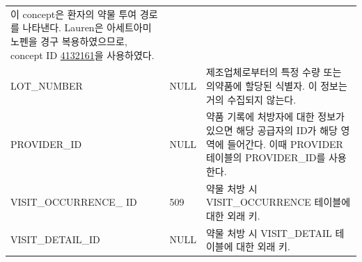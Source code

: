 \documentclass[10.5pt]{book}
\theoremstyle{definition}
\theoremstyle{definition}
\theoremstyle{definition}
\theoremstyle{remark}
\begin{document}
\begin{longtable}[]{@{}lll@{}}
\begin{minipage}[t]{0.48\columnwidth}
이 concept은 환자의 약물 투여 경로를 나타낸다. Lauren은 아세트아미노펜을
경구 복용하였으므로, concept ID
\href{http://athena.ohdsi.org/search-terms/terms/4132161}{4132161}을
사용하였다.\strut
\end{minipage}\tabularnewline
\begin{minipage}[t]{0.28\columnwidth}\raggedright\strut
LOT\_NUMBER\strut
\end{minipage} & \begin{minipage}[t]{0.16\columnwidth}\raggedright\strut
NULL\strut
\end{minipage} & \begin{minipage}[t]{0.48\columnwidth}\raggedright\strut
제조업체로부터의 특정 수량 또는 의약품에 할당된 식별자. 이 정보는 거의
수집되지 않는다.\strut
\end{minipage}\tabularnewline
\begin{minipage}[t]{0.28\columnwidth}\raggedright\strut
PROVIDER\_ID\strut
\end{minipage} & \begin{minipage}[t]{0.16\columnwidth}\raggedright\strut
NULL\strut
\end{minipage} & \begin{minipage}[t]{0.48\columnwidth}\raggedright\strut
약품 기록에 처방자에 대한 정보가 있으면 해당 공급자의 ID가 해당 영역에
들어간다. 이때 PROVIDER 테이블의 PROVIDER\_ID를 사용한다.\strut
\end{minipage}\tabularnewline
\begin{minipage}[t]{0.28\columnwidth}\raggedright\strut
VISIT\_OCCURRENCE\_ ID\strut
\end{minipage} & \begin{minipage}[t]{0.16\columnwidth}\raggedright\strut
509\strut
\end{minipage} & \begin{minipage}[t]{0.48\columnwidth}\raggedright\strut
약물 처방 시 VISIT\_OCCURRENCE 테이블에 대한 외래 키.\strut
\end{minipage}\tabularnewline
\begin{minipage}[t]{0.28\columnwidth}\raggedright\strut
VISIT\_DETAIL\_ID\strut
\end{minipage} & \begin{minipage}[t]{0.16\columnwidth}\raggedright\strut
NULL\strut
\end{minipage} & \begin{minipage}[t]{0.48\columnwidth}\raggedright\strut
약물 처방 시 VISIT\_DETAIL 테이블에 대한 외래 키.\strut
\end{minipage}\tabularnewline

\end{longtable}
\end{document}
